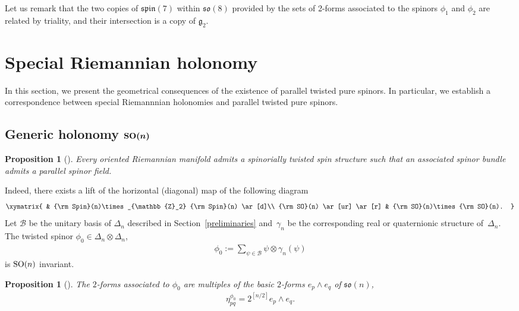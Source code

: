 \documentclass[pdftex]{sigma}
\numberwithin{equation}{section}
\newtheorem{Proposition}[Theorem]{Proposition}
 { \theoremstyle{definition}
\newtheorem{Definition}[Theorem]{Definition}
\newtheorem{Remark}[Theorem]{Remark}
\newtheorem{Example}[Theorem]{Example}
}
\begin{document}
Let us remark that the two copies of $\mathfrak{spin}(7)$ within $ \mathfrak{so}(8)$ provided by the sets of 2-forms associated to the spinors $\phi_1$ and $\phi_2$ are related by triality, and their intersection is a copy of $\mathfrak{g}_2$.

\section{Special Riemannian holonomy} \label{sec:holonomy}

In this section, we present the geometrical consequences of the existence of parallel twisted pure spinors. In particular, we establish a correspondence between special Riemannnian holonomies and parallel twisted pure spinors.

\subsection[Generic holonomy ${\rm SO}(n)$]{Generic holonomy $\boldsymbol{{\rm SO}(n)}$}

\begin{Proposition}[\cite{Espinosa-Herrera}] Every oriented Riemannian manifold admits a spinorially twisted spin structure such that an associated spinor bundle admits a parallel spinor field.
\end{Proposition}

Indeed, there exists a lift of the horizontal (diagonal) map
of the following diagram
\begin{gather*}
\xymatrix{
 & {\rm Spin}(n)\times_{\mathbb{Z}_2} {\rm Spin}(n) \ar[d]\\
{\rm SO}(n) \ar[ur] \ar[r] & {\rm SO}(n)\times {\rm SO}(n).
}
\end{gather*}
Let $\mathcal{B}$ be the unitary basis of $\Delta_n$ described in Section~\ref{preliminaries} and~$\gamma_n$ be the corresponding real or quaternionic structure of~$\Delta_n$. The twisted spinor $\phi_0\in\Delta_n\otimes \Delta_n$,
\begin{gather*}
\phi_0 := \sum_{\psi\in\mathcal{B}} \psi\otimes \gamma_n(\psi)
\end{gather*}
is ${\rm SO}(n)$ invariant.

\begin{Proposition}[\cite{Espinosa-Herrera}] The $2$-forms associated to $\phi_0$ are multiples of the basic $2$-forms $e_p\wedge e_q$ of $\mathfrak{so}(n)$,
\begin{gather*}\eta_{pq}^{\phi_0} = 2^{[n/2]} e_p\wedge e_q.\end{gather*}
\end{Proposition}
\end{document}
